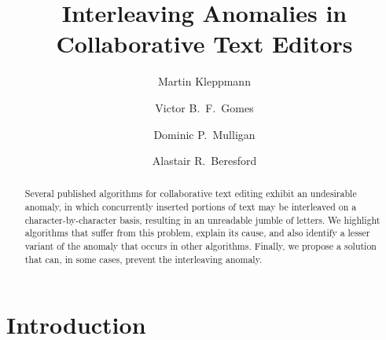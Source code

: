\documentclass[sigconf]{acmart}
\begin{document}
\title{Interleaving Anomalies in Collaborative Text Editors}

\author{Martin Kleppmann}

\author{Victor B.\ F.\ Gomes}

\author{Dominic P.\ Mulligan}

\author{Alastair R.\ Beresford}

\begin{abstract}
  Several published algorithms for collaborative text editing exhibit an undesirable anomaly, in which concurrently inserted portions of text may be interleaved on a character-by-character basis, resulting in an unreadable jumble of letters.
  We highlight algorithms that suffer from this problem, explain its cause, and also identify a lesser variant of the anomaly that occurs in other algorithms.
  Finally, we propose a solution that can, in some cases, prevent the interleaving anomaly.
\end{abstract}

%
%
\begin{CCSXML}
\end{CCSXML}

\maketitle

\section{Introduction}
\end{document}
